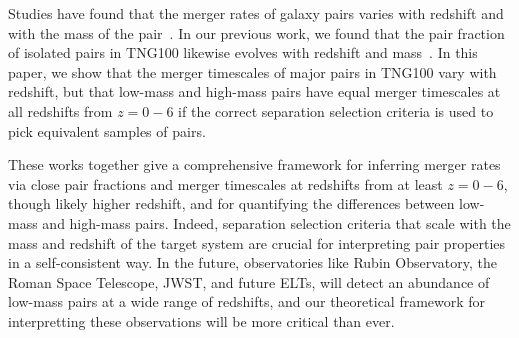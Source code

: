\documentclass[twocolumn,linenumbers]{aastex631}
\begin{document}
    Studies have found that the merger rates of galaxy pairs varies with redshift and with the mass of the pair~\citep{Stewart2009,Hopkins2010a,RG2015}.
    In our previous work, we found that the pair fraction of isolated pairs in TNG100 likewise evolves with redshift and mass~\citep{Chamberlain2024}. 
    In this paper, we show that the merger timescales of major pairs in TNG100 vary with redshift, but that low-mass and high-mass pairs have equal merger timescales at all redshifts from $z=0-6$ if the correct separation selection criteria is used to pick equivalent samples of pairs.
    
    These works together give a comprehensive framework for inferring merger rates via close pair fractions and merger timescales at redshifts from at least $z=0-6$, though likely higher redshift, and for quantifying the differences between low-mass and high-mass pairs.
    Indeed, separation selection criteria that scale with the mass and redshift of the target system are crucial for interpreting pair properties in a self-consistent way. 
    In the future, observatories like Rubin Observatory, the Roman Space Telescope, JWST, and future ELTs, will detect an abundance of low-mass pairs at a wide range of redshifts, and our theoretical framework for interpretting these observations will be more critical than ever. 










{}

\end{document}
